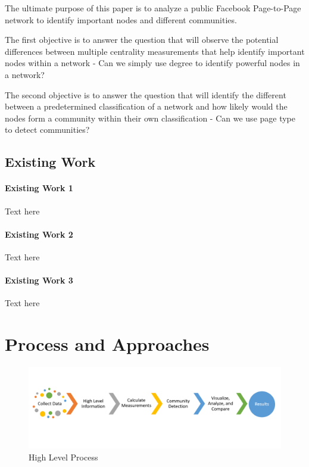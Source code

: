 \documentclass[11pt,twocolumn]{article}
\begin{document}
The ultimate purpose of this paper is to analyze a public Facebook Page-to-Page network to identify important nodes and different communities. 

The first objective is to answer the question that will observe the potential differences between multiple centrality measurements that help identify important nodes within a network - Can we simply use degree to identify powerful nodes in a network?


The second objective is to answer the question that will identify the different between a predetermined classification of a network and how likely would the nodes form a community within their own classification - Can we use page type to detect communities?




\subsection{Existing Work}

\paragraph{Existing Work 1 \cite{world-happiness-report-2018}} Text here
   
\paragraph{Existing Work 2 \cite{world-happiness-report-2018}} Text here

\paragraph{Existing Work 3 \cite{world-happiness-report-2018}} Text here


\section{Process and Approaches}

\begin{figure}[hbt!]
\includegraphics[scale=0.2]{process_flow.PNG} 
\caption{High Level Process}
\end{figure}
\end{document}

